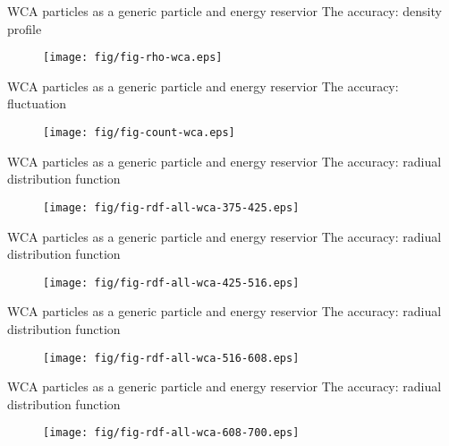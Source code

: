 \documentclass[]{beamer}
\begin{document}
\begin{frame}{WCA particles as a generic particle and energy reservior}
  {The accuracy: density profile}
  \begin{figure}
    \centering 
    \texttt{[image: fig/fig-rho-wca.eps]}
  \end{figure}
\end{frame}

\begin{frame}{WCA particles as a generic particle and energy reservior}
  {The accuracy: fluctuation}
  \begin{figure}
    \centering 
    \texttt{[image: fig/fig-count-wca.eps]}
  \end{figure}
\end{frame}

\begin{frame}{WCA particles as a generic particle and energy reservior}
  {The accuracy: radiual distribution function}
  \begin{figure}
    \centering 
    \texttt{[image: fig/fig-rdf-all-wca-375-425.eps]}
  \end{figure}
\end{frame}

\begin{frame}{WCA particles as a generic particle and energy reservior}
  {The accuracy: radiual distribution function}
  \begin{figure}
    \centering 
    \texttt{[image: fig/fig-rdf-all-wca-425-516.eps]}
  \end{figure}
\end{frame}

\begin{frame}{WCA particles as a generic particle and energy reservior}
  {The accuracy: radiual distribution function}
  \begin{figure}
    \centering 
    \texttt{[image: fig/fig-rdf-all-wca-516-608.eps]}
  \end{figure}
\end{frame}

\begin{frame}{WCA particles as a generic particle and energy reservior}
  {The accuracy: radiual distribution function}
  \begin{figure}
    \centering 
    \texttt{[image: fig/fig-rdf-all-wca-608-700.eps]}
  \end{figure}
\end{frame}
\end{document}

